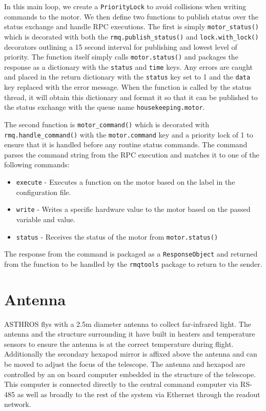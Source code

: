 In this main loop, we create a \texttt{PriorityLock} to avoid collisions when writing commands to the motor. 
We then define two functions to publish status over the status exchange and handle RPC executions.
The first is simply \texttt{motor\_status()} which is decorated with both the \texttt{rmq.publish\_status()} and \texttt{lock.with\_lock()} decorators outlining a 15 second interval for publishing and lowest level of priority.
The function itself simply calls \texttt{motor.status()} and packages the response as a dictionary with the \texttt{status} and \texttt{time} keys.
Any errors are caught and placed in the return dictionary with the \texttt{status} key set to 1 and the \texttt{data} key replaced with the error message.
When the function is called by the status thread, it will obtain this dictionary and format it so that it can be published to the status exchange with the queue name \texttt{housekeeping.motor}.

The second function is \texttt{motor\_command()} which is decorated with \texttt{rmq.handle\_command()} with the \texttt{motor.command} key and a priority lock of 1 to ensure that it is handled before any routine status commands.
The command parses the command string from the RPC execution and matches it to one of the following commands:
\begin{itemize}
    \item \texttt{execute} - Executes a function on the motor based on the label in the configuration file. 
    \item \texttt{write} - Writes a specific hardware value to the motor based on the passed variable and value.
    \item \texttt{status} - Receives the status of the motor from \texttt{motor.status()}
\end{itemize}
The response from the command is packaged as a \texttt{ResponseObject} and returned from the function to be handled by the \texttt{rmqtools} package to return to the sender. 

\section{Antenna}
ASTHROS flys with a 2.5m diameter antenna to collect far-infrared light. 
The antenna and the structure surrounding it have built in heaters and temperature sensors to ensure the antenna is at the correct temperature during flight.
Additionally the secondary hexapod mirror is affixed above the antenna and can be moved to adjust the focus of the telescope.
The antenna and hexapod are controlled by an on board computer embedded in the structure of the telescope.
This computer is connected directly to the central command computer via RS-485 as well as broadly to the rest of the system via Ethernet through the readout network.

